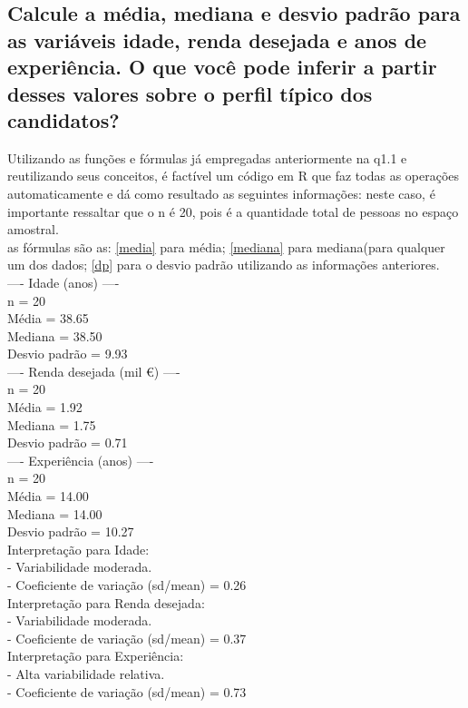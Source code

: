 \documentclass[12pt,a4paper]{article}
\begin{document}
\subsection{Calcule a média, mediana e desvio padrão para as variáveis idade, renda desejada e anos de experiência. O que você pode inferir a partir desses valores sobre o perfil típico dos candidatos?}
Utilizando as funções e fórmulas já empregadas anteriormente na q1.1 e reutilizando seus conceitos, é factível um código em R que faz todas as operações automaticamente e dá como resultado as seguintes informações:
neste caso, é importante ressaltar que o n é 20, pois é a quantidade total de pessoas no espaço amostral. \\
as fórmulas são as: \ref{media} para média; \ref{mediana} para mediana(para qualquer um dos dados; \ref{dp} para o desvio padrão utilizando as informações anteriores.\\
---- Idade (anos) ----\\n = 20
\\Média   = 38.65 \\Mediana = 38.50
\\Desvio padrão = 9.93\\---- Renda desejada (mil €) ----
\\n = 20\\Média   = 1.92
\\Mediana = 1.75\\Desvio padrão = 0.71
\\---- Experiência (anos) ----\\n = 20
\\Média   = 14.00\\Mediana = 14.00
\\Desvio padrão = 10.27\\Interpretação para Idade:
\\- Variabilidade moderada.\\- Coeficiente de variação (sd/mean) = 0.26
\\Interpretação para Renda desejada:\\- Variabilidade moderada.
\\- Coeficiente de variação (sd/mean) = 0.37\\Interpretação para Experiência:
\\- Alta variabilidade relativa.\\- Coeficiente de variação (sd/mean) = 0.73
\end{document}
